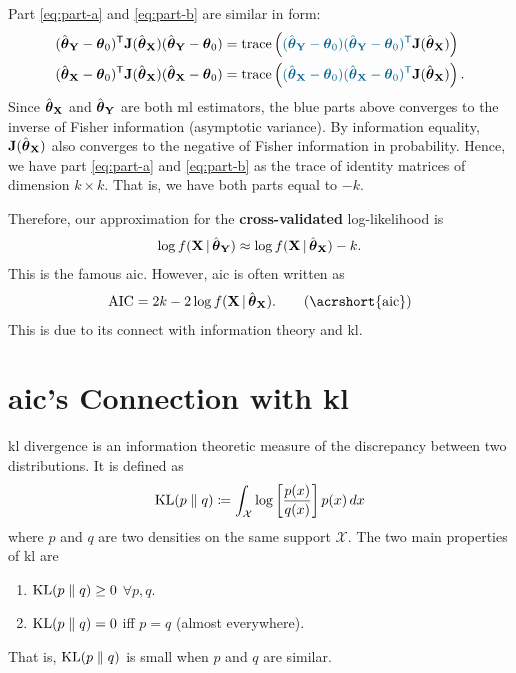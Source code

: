 \documentclass[a4paper]{article}
\begin{document}
Part \eqref{eq:part-a} and \eqref{eq:part-b} are similar in form:
\begin{align*}
	(\hat\ttheta_{\YY}-\ttheta_{0})\T
	\JJ(\hat\ttheta_{\XX})
	(\hat\ttheta_{\YY}-\ttheta_{0})
	&=
	\trace
	\left(
	\blue{
	(\hat\ttheta_{\YY}-\ttheta_{0})
	(\hat\ttheta_{\YY}-\ttheta_{0})\T
	}
	\JJ(\hat\ttheta_{\XX})
	\right) \\
	(\hat\ttheta_{\XX}-\ttheta_{0})\T
	\JJ(\hat\ttheta_{\XX})
	(\hat\ttheta_{\XX}-\ttheta_{0})
	&=
	\trace
	\left(
	\blue{
	(\hat\ttheta_{\XX}-\ttheta_{0})
	(\hat\ttheta_{\XX}-\ttheta_{0})\T
	}
	\JJ(\hat\ttheta_{\XX})
	\right).
\end{align*}
Since $\hat{\boldsymbol{\theta}}_{\mathbf{X}}$ and $\hat{\boldsymbol{\theta}}_{\mathbf{Y}}$ are both \acrshort{ml} estimators,
the blue parts above converges to the inverse of Fisher information (asymptotic variance).
By information equality,
$\mathbf{J}(\hat{\boldsymbol{\theta}}_{\mathbf{X}})$ also converges to the negative of Fisher information in probability.
Hence, we have part \eqref{eq:part-a} and \eqref{eq:part-b} as the trace of identity matrices of dimension $k\times k$.
That is, we have both parts equal to $-k$.

Therefore, our approximation for the \textbf{cross-validated} log-likelihood is
\begin{align*}
	\log f(\mathbf{X}\,|\,\hat{\boldsymbol{\theta}}_{\mathbf{Y}})
	\approx
	\log f(\mathbf{X}\,|\,\hat{\boldsymbol{\theta}}_{\mathbf{X}}) - k.
\end{align*}
This is the famous \acrshort{aic}.
However, \acrshort{aic} is often written as
\begin{align*}
	\aic = 2k - 2 \log f(\XX\given\hat\ttheta_{\XX}). \label{eq:aic}\tag{\acrshort{aic}}
\end{align*}
This is due to its connect with information theory and \acrlong{kl}.

\section{\texorpdfstring{\acrshort{aic}}{AIC}'s Connection with \texorpdfstring{\acrlong{kl}}{KL Divergence}}

\acrshort{kl} divergence is an information theoretic measure of the discrepancy between two distributions.
It is defined as
\begin{align*}
	\operatorname{KL}(p\;\|\; q) \coloneqq \int_{\mathcal{X}} \log\left[\frac{p(x)}{q(x)}\right]p(x)\,d{x}
\end{align*}
where $p$ and $q$ are two densities on the same support $\mathcal{X}$.
The two main properties of \acrshort{kl} are
\begin{enumerate}
	\item $\operatorname{KL}(p\;\|\; q)\geq 0$ $\forall p,q$.
	\item $\operatorname{KL}(p\;\|\; q)=0$ iff $p=q$ (almost everywhere).
\end{enumerate}
That is, $\operatorname{KL}(p\;\|\; q)$ is small when $p$ and $q$ are similar.
\end{document}
